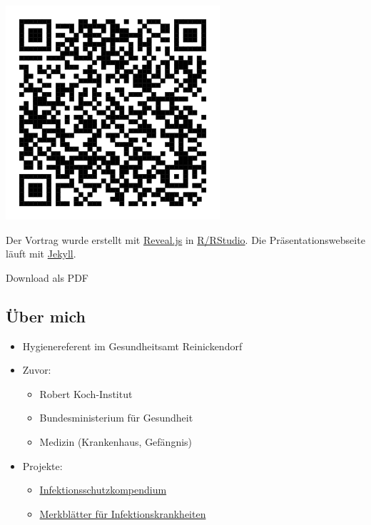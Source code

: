 \documentclass[
]{article}
\providecommand{\tightlist}{%
  \setlength{\itemsep}{0pt}\setlength{\parskip}{0pt}}
\begin{document}
\includegraphics{../assets/2022-04-08-WBKD-Gastroenteritis/QR-doc.svg}

Der Vortrag wurde erstellt mit \href{https://revealjs.com/}{Reveal.js}
in \href{https://www.rstudio.com/}{R/RStudio}. Die Präsentationswebseite
läuft mit \href{https://jekyllrb.com/}{Jekyll}.

Download als PDF

\hypertarget{uxfcber-mich}{%
\subsection{Über mich}\label{uxfcber-mich}}

\begin{itemize}
\tightlist
\item
  Hygienereferent im Gesundheitsamt Reinickendorf
\item
  Zuvor:

  \begin{itemize}
  \tightlist
  \item
    Robert Koch-Institut
  \item
    Bundesministerium für Gesundheit
  \item
    Medizin (Krankenhaus, Gefängnis)
  \end{itemize}
\item
  Projekte:

  \begin{itemize}
  \tightlist
  \item
    \href{https://jakobschumacher.github.io/infektionsschutzkompendium/}{Infektionsschutzkompendium}
  \item
    \href{http://merkblaetter-fuer-infektionskrankheiten.de/}{Merkblätter
    für Infektionskrankheiten}
  \end{itemize}
\end{itemize}
\end{document}

